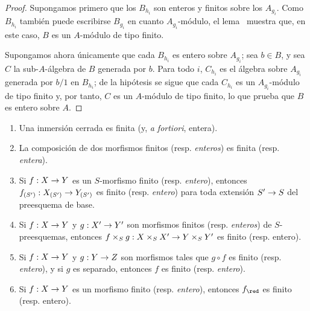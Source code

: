 \documentclass[oneside,10pt]{amsart}
\makeatletter
\newcommand{\ega@arrow}[2]{\mathchoice{#1}{#2}{#2}{#2}}
\renewcommand{\to}{\ega@arrow{\longrightarrow}{\rightarrow}}
\let\EGAOriginalLabel\label
\renewcommand{\label}[1]{\phantomsection\EGAOriginalLabel{#1}}
\makeatother
\begin{document}
\begin{proof}
Supongamos primero que los $B_{h_i}$ son enteros y finitos sobre los $A_{g_i}$.
Como $B_{h_i}$ también puede escribirse $B_{g_i}$ en cuanto $A_{g_i}$-módulo, el lema~ muestra que, en este caso, $B$ es un $A$-módulo de tipo finito.

Supongamos ahora únicamente que cada $B_{h_i}$ es entero sobre $A_{g_i}$;
sea $b\in B$, y sea $C$ la sub-$A$-álgebra de $B$ generada por $b$.
Para todo $i$, $C_{h_i}$ es el álgebra sobre $A_{g_i}$ generada por $b/1$ en $B_{h_i}$;
de la hipótesis se sigue que cada $C_{h_i}$ es un $A_{g_i}$-módulo de tipo finito y, por tanto,  $C$ es un $A$-módulo de tipo finito, lo que prueba que $B$ es entero sobre $A$.
\end{proof}

\begin{proposition}[6.1.5]
\label{II.6.1.5}
\medskip\noindent
\begin{enumerate}
  \item[{\rm(i)}] Una inmersión cerrada es finita (y, \emph{a fortiori}, entera).
  \item[{\rm(ii)}] La composición de dos morfismos finitos \textup{(resp. \emph{enteros})} es finita \textup{(resp. \emph{entera})}.
  \item[{\rm(iii)}] Si $f:X\to Y$ es un $S$-morfismo finito \textup{(resp. \emph{entero})}, entonces $f_{(S')}:X_{(S')}\to Y_{(S')}$ es finito \textup{(resp. \emph{entero})} para toda extensión $S'\to S$ del preesquema de base.
  \item[{\rm(iv)}] Si $f:X\to Y$ y $g:X'\to Y'$ son morfismos finitos \textup{(resp. \emph{enteros})} de $S$-preesquemas, entonces $f\times_S g:X\times_S X'\to Y\times_S Y'$ es finito (resp. entero).
  \item[{\rm(v)}] Si $f:X\to Y$ y $g:Y\to Z$ son morfismos tales que $g\circ f$ es finito \textup{(resp. \emph{entero})}, y si $g$ es separado, entonces $f$ es finito \textup{(resp. \emph{entero})}.
  \item[{\rm(vi)}] Si $f:X\to Y$ es un morfismo finito \textup{(resp. \emph{entero})}, entonces $f_\red$ es finito (resp. entero).
\end{enumerate}
\end{proposition}
\end{document}
